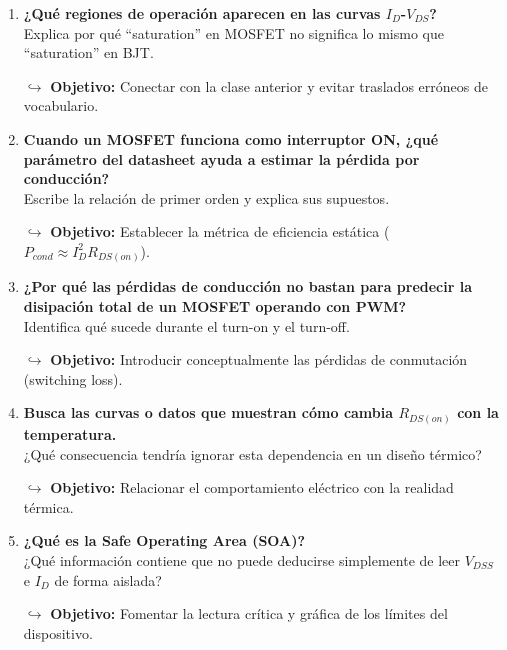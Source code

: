 \documentclass[11pt, a4paper]{article}
\begin{document}
\begin{enumerate}[label=\textbf{\arabic*.}, leftmargin=*, itemsep=12pt]
    \item \textbf{¿Qué regiones de operación aparecen en las curvas $I_D$-$V_{DS}$?}\\
    Explica por qué ``saturation'' en MOSFET no significa lo mismo que ``saturation'' en BJT.
    \par\vspace{2pt}\textcolor{objgray}{\small $\hookrightarrow$ \textbf{Objetivo:} Conectar con la clase anterior y evitar traslados erróneos de vocabulario.}

    \item \textbf{Cuando un MOSFET funciona como interruptor ON, ¿qué parámetro del datasheet ayuda a estimar la pérdida por conducción?}\\
    Escribe la relación de primer orden y explica sus supuestos.
    \par\vspace{2pt}\textcolor{objgray}{\small $\hookrightarrow$ \textbf{Objetivo:} Establecer la métrica de eficiencia estática ($P_{cond} \approx I_D^2 R_{DS(on)}$).}

    \item \textbf{¿Por qué las pérdidas de conducción no bastan para predecir la disipación total de un MOSFET operando con PWM?}\\
    Identifica qué sucede durante el turn-on y el turn-off.
    \par\vspace{2pt}\textcolor{objgray}{\small $\hookrightarrow$ \textbf{Objetivo:} Introducir conceptualmente las pérdidas de conmutación (switching loss).}

    \item \textbf{Busca las curvas o datos que muestran cómo cambia $R_{DS(on)}$ con la temperatura.}\\
    ¿Qué consecuencia tendría ignorar esta dependencia en un diseño térmico?
    \par\vspace{2pt}\textcolor{objgray}{\small $\hookrightarrow$ \textbf{Objetivo:} Relacionar el comportamiento eléctrico con la realidad térmica.}

    \item \textbf{¿Qué es la Safe Operating Area (SOA)?}\\
    ¿Qué información contiene que no puede deducirse simplemente de leer $V_{DSS}$ e $I_D$ de forma aislada?
    \par\vspace{2pt}\textcolor{objgray}{\small $\hookrightarrow$ \textbf{Objetivo:} Fomentar la lectura crítica y gráfica de los límites del dispositivo.}


\end{enumerate}
\end{document}
